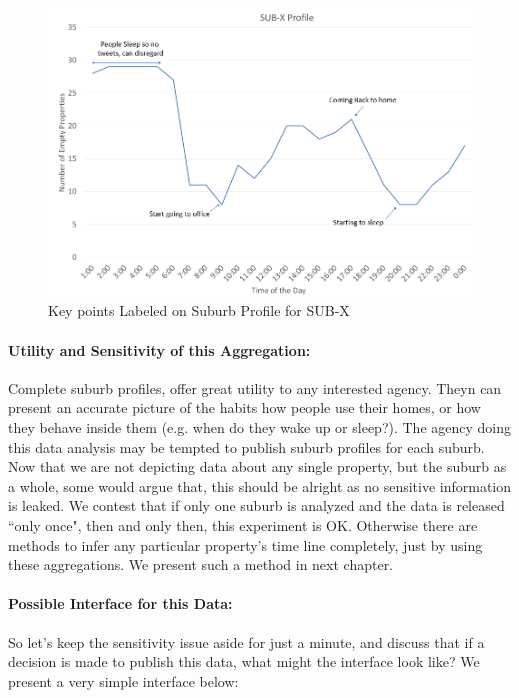 \documentclass[12pt]{report}
\theoremstyle{named}
\begin{document}
\begin{figure}[ht]
\centering
        \includegraphics[width=150mm,scale=1]{Images/SubXProfileLabeled.png}
    \caption{Key points Labeled on Suburb Profile for SUB-X}
    \label{fig:SubXProfileLabeled}
\end{figure}



\paragraph{Utility and Sensitivity of this Aggregation:\\}
Complete suburb profiles, offer great utility to any interested agency. Theyn can present an accurate picture of the habits how people use their homes, or how they behave inside them (e.g. when do they wake up or sleep?). The agency doing this data analysis may be tempted to publish suburb profiles for each suburb. Now that we are not depicting data about any single property, but the suburb as a whole, some would argue that, this should be alright as no sensitive information is leaked. We contest that if only one suburb is analyzed and the data is released ``only once", then and only then, this experiment is OK. Otherwise there are methods to infer any particular property's time line completely, just by using these aggregations. We present such a method in next chapter. 

\paragraph{Possible Interface for this Data:\\}
So let's keep the sensitivity issue aside for just a minute, and discuss that if a decision is made to publish this data, what might the interface look like? We present a very simple interface below:
\end{document}
